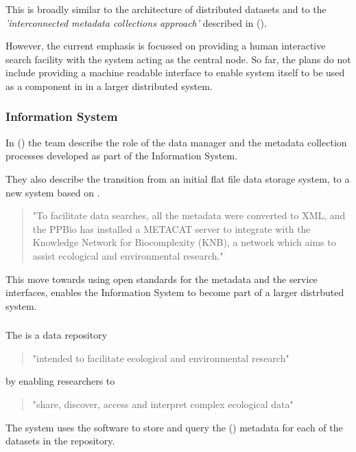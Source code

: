 \documentclass{article}
\begin{document}
This is broadly similar to the \cite{vo} architecture of distributed datasets and to the
\textit{'interconnected metadata collections approach'} described in
 (\cite{jones-2006}).

However, the current emphasis is focussed on providing a human interactive
search facility with the \cite{givd} system acting as the central node.
So far, the plans do not include providing a machine readable interface to
enable \cite{givd} system itself to be used as a component in in a larger
distributed system.

\subsubsection{\cite{ppbio} Information System}

In  (\cite{pezzini-2012}) 
the \cite{ppbio} team describe the role of the data manager and the metadata
collection processes developed as part of the \cite{ppbio} Information System.

They also describe the transition from an initial flat file data storage system,
to a new system based on \cite{metacat}.

\begin{quote}
"To facilitate data searches, all the metadata were converted to XML,
and the PPBio has installed a METACAT server to integrate with the
Knowledge Network for Biocomplexity (KNB), a network which aims to
assist ecological and environmental research."
\end{quote}

This move towards using open standards for the metadata and the service
interfaces, enables the \cite{ppbio} Information System to become part
of a larger distrbuted system.

\subsubsection{}

The  {\cite{knb}} is a data repository
\begin{quote}
"intended to facilitate ecological and environmental research"
\end{quote}
by enabling researchers to
\begin{quote}
"share, discover, access and interpret complex ecological data"
\end{quote}

The \cite{knb} system uses the \cite{metacat} software to store and query
the  (\cite{eml}) metadata for each of the datasets in the repository.
\end{document}
